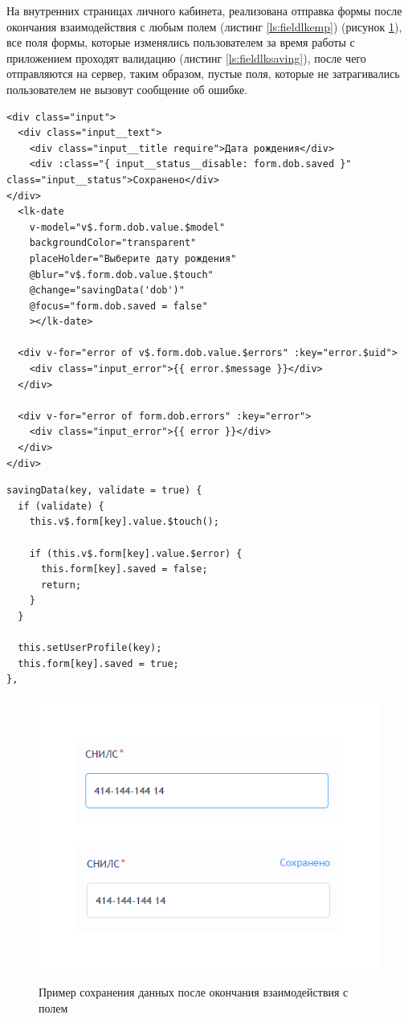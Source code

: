 На внутренних страницах личного кабинета, реализована отправка формы после окончания взаимодействия с любым полем (листинг \ref{ls:fieldlkemp}) (рисунок \ref{fig:inputsave}), все поля формы, которые изменялись пользователем за время работы с приложением проходят валидацию (листинг \ref{ls:fieldlksaving}), после чего отправляются на сервер, таким образом, пустые поля, которые не затрагивались пользователем не вызовут сообщение об ошибке.

\begin{lstlisting}[caption={Пример поля с отправкой данных на сервер после окончания взаимодействия}, label={ls:fieldlkemp}]
<div class="input">
  <div class="input__text">
    <div class="input__title require">Дата рождения</div>
    <div :class="{ input__status__disable: form.dob.saved }" class="input__status">Сохранено</div>
</div>
  <lk-date
    v-model="v$.form.dob.value.$model"
    backgroundColor="transparent"
    placeHolder="Выберите дату рождения"
    @blur="v$.form.dob.value.$touch"
    @change="savingData('dob')"
    @focus="form.dob.saved = false"
    ></lk-date>

  <div v-for="error of v$.form.dob.value.$errors" :key="error.$uid">
    <div class="input_error">{{ error.$message }}</div>
  </div>

  <div v-for="error of form.dob.errors" :key="error">
    <div class="input_error">{{ error }}</div>
  </div>
</div>
\end{lstlisting}

\begin{lstlisting}[caption={Метод валидирующий поле и передающий данные для отправки на сервер}, label={ls:fieldlksaving}]
savingData(key, validate = true) {
  if (validate) {
    this.v$.form[key].value.$touch();

    if (this.v$.form[key].value.$error) {
      this.form[key].saved = false;
      return;
    }
  }

  this.setUserProfile(key);
  this.form[key].saved = true;
},
\end{lstlisting}

\begin{figure}[H]
\begin{center}
\includegraphics[width=0.6\hsize]{fig/input-save.png}\\[2mm]
\caption{Пример сохранения данных после окончания взаимодействия с полем}\label{fig:inputsave}
\end{center}
\end{figure}

